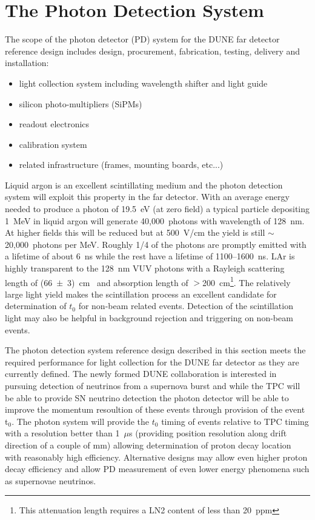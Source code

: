 \section{The Photon Detection System}
\label{sec:detectors-fd-ref-pd}

The scope of the photon detector (PD) system for the DUNE far detector
reference design includes design, procurement, fabrication,
testing, delivery and installation:
\begin{itemize}
\item light collection system including wavelength shifter and light guide
\item silicon photo-multipliers (SiPMs)
\item readout electronics
\item calibration system
\item related infrastructure (frames, mounting boards, etc...)
\end{itemize}

Liquid argon is an excellent scintillating medium and the photon
detection system will exploit this property in the far detector.  With
an average energy needed to produce a photon of 19.5~eV (at zero
field) a typical particle depositing 1~MeV in liquid argon will
generate 40,000~photons with wavelength of 128~nm. At higher fields
this will be reduced but at 500~V/cm the yield is still
$\sim$20,000~photons per MeV. Roughly 1/4 of the photons are promptly
emitted with a lifetime of about 6~ns while the rest have a lifetime
of 1100--1600~ns. LAr is highly transparent to the 128~nm VUV photons
with a Rayleigh scattering length of (66~$\pm$~3)~cm~\cite{Rayleigh}
and absorption length of $>$200~cm\footnote{This attenuation length
  requires a LN2 content of less than 20~ppm}. The relatively large light yield
makes the scintillation process an excellent candidate for
determination of $t_0$ for non-beam related events. Detection of the
scintillation light may also be helpful in background rejection and
triggering on non-beam events.

The photon detection system reference design described in this section
meets the required performance for light collection for the DUNE far
detector as they are currently defined. The newly formed DUNE
collaboration is interested in pursuing detection of neutrinos from a
supernova burst and while the TPC will be able to provide SN neutrino
detection the photon detector will be able to improve the momentum
resoultion of these events through provision of the event t$_0$. The
photon system will provide the $t_0$ timing of events relative to TPC
timing with a resolution better than 1~$\mu$s (providing position
resolution along drift direction of a couple of mm) allowing determination
of proton decay location with reasonably high efficiency.  Alternative
designs may allow even higher proton decay efficiency and allow PD
measurement of even lower energy phenomena such as supernovae
neutrinos.

